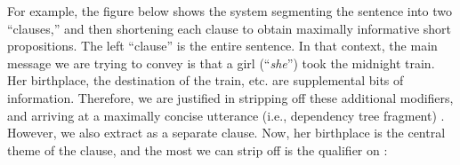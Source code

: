 For example, the figure below shows the system segmenting the sentence
   into
  two ``clauses,'' and then shortening each clause to obtain maximally informative
  short propositions.
The left ``clause'' is the entire sentence.
In that context, the main message we are trying to convey is that a girl (``\textit{she}'') 
  took the midnight train.
Her birthplace, the destination of the train, etc. are supplemental bits of information.
Therefore, we are justified in stripping off these additional modifiers, and arriving
  at a maximally concise utterance (i.e., dependency tree fragment) .
However, we also extract  as a separate clause.
Now, her birthplace is the central theme of the clause, and the most we can strip off is the qualifier
   on :

